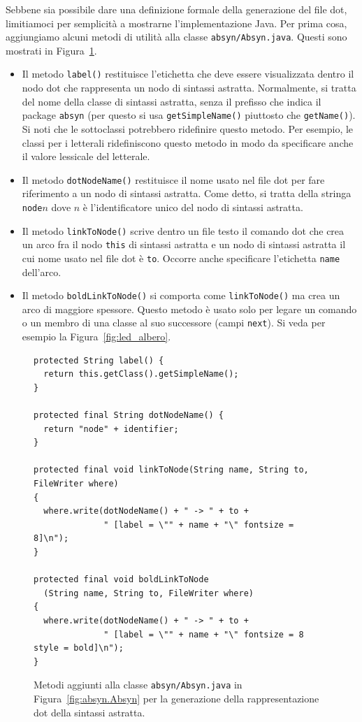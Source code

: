 Sebbene sia possibile dare una definizione formale della generazione
del file dot, limitiamoci per semplicit\`a a mostrarne l'implementazione Java.
Per prima cosa, aggiungiamo alcuni metodi di utilit\`a alla classe
\texttt{absyn/Absyn.java}. Questi sono mostrati in
Figura~\ref{fig:absyn.Absyn_dot}.
\begin{itemize}
\item Il metodo \texttt{label()} restituisce
l'etichetta che deve essere visualizzata dentro il nodo dot che
rappresenta un nodo di sintassi astratta. Normalmente, si tratta del
nome della classe di sintassi astratta, senza il prefisso che indica il
package \texttt{absyn} (per questo si usa \texttt{getSimpleName()}
piuttosto che \texttt{getName()}). Si noti che le sottoclassi potrebbero
ridefinire questo metodo. Per esempio, le classi per i letterali
ridefiniscono questo metodo in modo da specificare anche il valore lessicale
del letterale.
\item Il metodo \texttt{dotNodeName()} restituisce il nome usato nel file dot
per fare riferimento a un nodo di sintassi astratta. Come detto, si tratta
della stringa \texttt{node}$n$ dove $n$ \`e l'identificatore unico del
nodo di sintassi astratta.
\item Il metodo \texttt{linkToNode()} scrive dentro un file testo il comando
dot che crea un arco fra il nodo \texttt{this} di sintassi astratta e un
nodo di sintassi astratta il cui nome usato nel file dot \`e \texttt{to}.
Occorre anche specificare l'etichetta \texttt{name} dell'arco.
\item Il metodo \texttt{boldLinkToNode()} si comporta come
\texttt{linkToNode()} ma crea un arco di maggiore spessore. Questo
metodo \`e usato solo per legare un comando o un membro di una classe
al suo successore (campi \texttt{next}). Si veda per esempio la
Figura~\ref{fig:led_albero}.
\end{itemize}
%
\begin{figure}[t]
\begin{verbatim}
protected String label() {
  return this.getClass().getSimpleName();
}

protected final String dotNodeName() {
  return "node" + identifier;
}

protected final void linkToNode(String name, String to, FileWriter where)
{
  where.write(dotNodeName() + " -> " + to +
              " [label = \"" + name + "\" fontsize = 8]\n");
}

protected final void boldLinkToNode
  (String name, String to, FileWriter where)
{
  where.write(dotNodeName() + " -> " + to +
              " [label = \"" + name + "\" fontsize = 8 style = bold]\n");
}
\end{verbatim}
\caption{Metodi aggiunti alla classe \texttt{absyn/Absyn.java} in Figura~\ref{fig:absyn.Absyn} per la generazione della rappresentazione dot della sintassi astratta.}
  \label{fig:absyn.Absyn_dot}
\end{figure}

